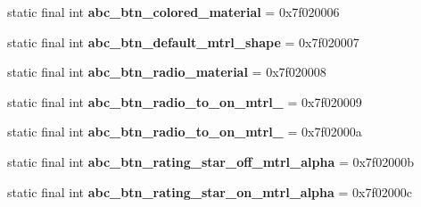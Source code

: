 \begin{DoxyCompactItemize}
\item 
\hypertarget{classandroid_1_1support_1_1design_1_1_r_1_1drawable_ac6ab80376e6c2c49f68b33f9b4fa217f}{}static final int {\bfseries abc\+\_\+btn\+\_\+colored\+\_\+material} = 0x7f020006\label{classandroid_1_1support_1_1design_1_1_r_1_1drawable_ac6ab80376e6c2c49f68b33f9b4fa217f}

\item 
\hypertarget{classandroid_1_1support_1_1design_1_1_r_1_1drawable_a221d8c015be6efecdbce8deef1aff0d3}{}static final int {\bfseries abc\+\_\+btn\+\_\+default\+\_\+mtrl\+\_\+shape} = 0x7f020007\label{classandroid_1_1support_1_1design_1_1_r_1_1drawable_a221d8c015be6efecdbce8deef1aff0d3}

\item 
\hypertarget{classandroid_1_1support_1_1design_1_1_r_1_1drawable_a0eeed1992a879d933ae3d01f9507aa81}{}static final int {\bfseries abc\+\_\+btn\+\_\+radio\+\_\+material} = 0x7f020008\label{classandroid_1_1support_1_1design_1_1_r_1_1drawable_a0eeed1992a879d933ae3d01f9507aa81}

\item 
\hypertarget{classandroid_1_1support_1_1design_1_1_r_1_1drawable_a72ec210aab2eff83e2f3a2880ceb665b}{}static final int {\bfseries abc\+\_\+btn\+\_\+radio\+\_\+to\+\_\+on\+\_\+mtrl\+\_} = 0x7f020009\label{classandroid_1_1support_1_1design_1_1_r_1_1drawable_a72ec210aab2eff83e2f3a2880ceb665b}

\item 
\hypertarget{classandroid_1_1support_1_1design_1_1_r_1_1drawable_acaf233b381887822038a39dd0c57da41}{}static final int {\bfseries abc\+\_\+btn\+\_\+radio\+\_\+to\+\_\+on\+\_\+mtrl\+\_} = 0x7f02000a\label{classandroid_1_1support_1_1design_1_1_r_1_1drawable_acaf233b381887822038a39dd0c57da41}

\item 
\hypertarget{classandroid_1_1support_1_1design_1_1_r_1_1drawable_a662e96cae0e24a22736c05c01848a2d9}{}static final int {\bfseries abc\+\_\+btn\+\_\+rating\+\_\+star\+\_\+off\+\_\+mtrl\+\_\+alpha} = 0x7f02000b\label{classandroid_1_1support_1_1design_1_1_r_1_1drawable_a662e96cae0e24a22736c05c01848a2d9}

\item 
\hypertarget{classandroid_1_1support_1_1design_1_1_r_1_1drawable_a6da24d45567f7d46218c5943f1e81019}{}static final int {\bfseries abc\+\_\+btn\+\_\+rating\+\_\+star\+\_\+on\+\_\+mtrl\+\_\+alpha} = 0x7f02000c\label{classandroid_1_1support_1_1design_1_1_r_1_1drawable_a6da24d45567f7d46218c5943f1e81019}


\end{DoxyCompactItemize}
